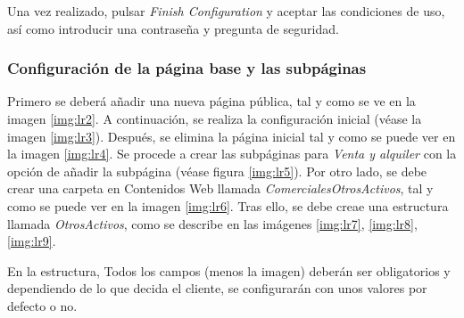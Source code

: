 \par Una vez realizado, pulsar \textit{Finish Configuration} y aceptar las condiciones de uso, así como introducir una contraseña y pregunta de seguridad.

\subsubsection{Configuración de la página base y las subpáginas}
\par Primero se deberá añadir una nueva página pública, tal y como se ve en la imagen \ref{img:lr2}. A continuación, se realiza la configuración inicial (véase la imagen \ref{img:lr3}). Después, se elimina la página inicial tal y como se puede ver en la imagen \ref{img:lr4}. Se procede a crear las subpáginas para \textit{Venta y alquiler} con la opción de añadir la subpágina (véase figura \ref{img:lr5}). Por otro lado, se debe crear una carpeta en Contenidos Web llamada \textit{ComercialesOtrosActivos}, tal y como se puede ver en la imagen \ref{img:lr6}. Tras ello, se debe creae una estructura llamada \textit{OtrosActivos}, como se describe en las imágenes \ref{img:lr7}, \ref{img:lr8}, \ref{img:lr9}.

\par En la estructura, Todos los campos (menos la imagen) deberán ser obligatorios y dependiendo de lo que decida el cliente, se configurarán con unos valores por defecto o no.
